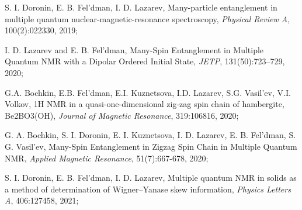 \item 
S. I. Doronin, E. B. Fel'dman,  I. D. Lazarev, Many-particle entanglement in multiple quantum nuclear-magnetic-resonance spectroscopy, \textit{Physical Review A}, 100(2):022330, 2019;

\item 
I. D. Lazarev and E. B. Fel'dman, Many-Spin Entanglement in Multiple Quantum NMR with a Dipolar Ordered Initial State,  \textit{JETP}, 131(50):723–729, 2020;

\item 
G.A. Bochkin, E.B. Fel'dman, E.I. Kuznetsova, I.D. Lazarev, S.G. Vasil'ev, V.I. Volkov, 1H NMR in a quasi-one-dimensional zig-zag spin chain of hambergite, Be2BO3(OH), \textit{Journal of Magnetic Resonance}, 319:106816, 2020;

\item 
G. A. Bochkin, S. I. Doronin, E. I. Kuznetsova, I. D. Lazarev, E. B. Fel'dman, S. G. Vasil'ev, Many-Spin Entanglement in Zigzag Spin Chain in Multiple Quantum NMR, \textit{Applied Magnetic Resonance}, 51(7):667-678, 2020;

\item 
S. I. Doronin, E. B. Fel'dman,  I. D. Lazarev, Multiple quantum NMR in solids as a method of determination of Wigner–Yanase skew information, \textit{Physics Letters A}, 406:127458, 2021;